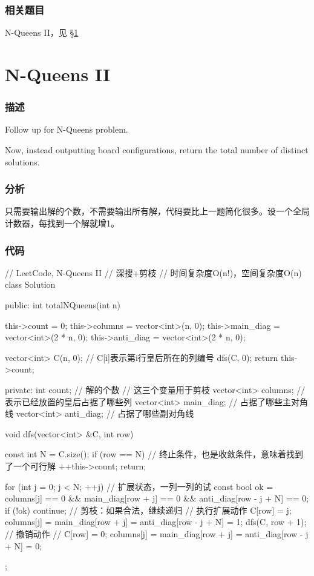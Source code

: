 \subsubsection{相关题目}
\begindot
\item N-Queens II，见 \S \ref{sec:n-queens-ii}
\myenddot


\section{N-Queens II} %
\label{sec:n-queens-ii}


\subsubsection{描述}
Follow up for N-Queens problem.

Now, instead outputting board configurations, return the total number of distinct solutions.


\subsubsection{分析}
只需要输出解的个数，不需要输出所有解，代码要比上一题简化很多。设一个全局计数器，每找到一个解就增1。


\subsubsection{代码}
\begin{Code}
// LeetCode, N-Queens II
// 深搜+剪枝
// 时间复杂度O(n!)，空间复杂度O(n)
class Solution {
public:
    int totalNQueens(int n) {
        this->count = 0;
        this->columns = vector<int>(n, 0);
        this->main_diag = vector<int>(2 * n, 0);
        this->anti_diag = vector<int>(2 * n, 0);

        vector<int> C(n, 0);  // C[i]表示第i行皇后所在的列编号
        dfs(C, 0);
        return this->count;
    }
private:
    int count; // 解的个数
    // 这三个变量用于剪枝
    vector<int> columns;  // 表示已经放置的皇后占据了哪些列
    vector<int> main_diag;  // 占据了哪些主对角线
    vector<int> anti_diag;  // 占据了哪些副对角线

    void dfs(vector<int> &C, int row) {
        const int N = C.size();
        if (row == N) { // 终止条件，也是收敛条件，意味着找到了一个可行解
            ++this->count;
            return;
        }

        for (int j = 0; j < N; ++j) {  // 扩展状态，一列一列的试
            const bool ok = columns[j] == 0 &&
                    main_diag[row + j] == 0 &&
                    anti_diag[row - j + N] == 0;
            if (!ok) continue;  // 剪枝：如果合法，继续递归
            // 执行扩展动作
            C[row] = j;
            columns[j] = main_diag[row + j] =
                    anti_diag[row - j + N] = 1;
            dfs(C, row + 1);
            // 撤销动作
            // C[row] = 0;
            columns[j] = main_diag[row + j] =
                    anti_diag[row - j + N] = 0;
        }
    }
};
\end{Code}


